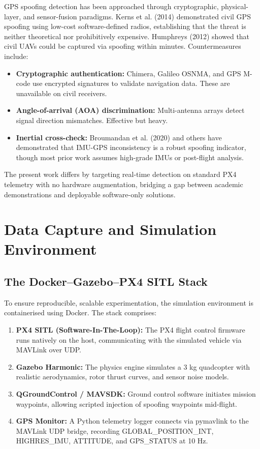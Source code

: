 \documentclass[11pt,a4paper]{article}
\begin{document}
GPS spoofing detection has been approached through cryptographic, physical-layer, and sensor-fusion paradigms. Kerns et al. (2014) demonstrated civil GPS spoofing using low-cost software-defined radios, establishing that the threat is neither theoretical nor prohibitively expensive. Humphreys (2012) showed that civil UAVs could be captured via spoofing within minutes. Countermeasures include:

\begin{itemize}
    \item \textbf{Cryptographic authentication:} Chimera, Galileo OSNMA, and GPS M-code use encrypted signatures to validate navigation data. These are unavailable on civil receivers.
    \item \textbf{Angle-of-arrival (AOA) discrimination:} Multi-antenna arrays detect signal direction mismatches. Effective but heavy.
    \item \textbf{Inertial cross-check:} Broumandan et al. (2020) and others have demonstrated that IMU-GPS inconsistency is a robust spoofing indicator, though most prior work assumes high-grade IMUs or post-flight analysis.
\end{itemize}

The present work differs by targeting real-time detection on standard PX4 telemetry with no hardware augmentation, bridging a gap between academic demonstrations and deployable software-only solutions.

\section{Data Capture and Simulation Environment}

\subsection{The Docker--Gazebo--PX4 SITL Stack}

To ensure reproducible, scalable experimentation, the simulation environment is containerised using Docker. The stack comprises:

\begin{enumerate}
    \item \textbf{PX4 SITL (Software-In-The-Loop):} The PX4 flight control firmware runs natively on the host, communicating with the simulated vehicle via MAVLink over UDP.
    \item \textbf{Gazebo Harmonic:} The physics engine simulates a 3 kg quadcopter with realistic aerodynamics, rotor thrust curves, and sensor noise models.
    \item \textbf{QGroundControl / MAVSDK:} Ground control software initiates mission waypoints, allowing scripted injection of spoofing waypoints mid-flight.
    \item \textbf{GPS Monitor:} A Python telemetry logger connects via pymavlink to the MAVLink UDP bridge, recording GLOBAL\_POSITION\_INT, HIGHRES\_IMU, ATTITUDE, and GPS\_STATUS at 10 Hz.
\end{enumerate}
\end{document}

